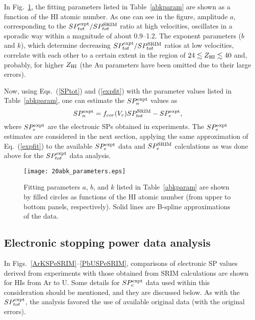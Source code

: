 \documentclass[aps,pra,twocolumn,amsmath,amssymb,floatfix]{revtex4-2}
\begin{document}
In Fig.~\ref{abkpar}, the fitting parameters listed in Table~\ref{abkparam} are shown as a function of the HI atomic number. As one can see in the figure, amplitude $a$, corresponding to the $SP_{tot}^{\rm expt}/SP_{tot}^{\rm SRIM}$ ratio at high velocities, oscillates in a sporadic way within a magnitude of about 0.9--1.2. The exponent parameters ($b$ and $k$), which determine decreasing $SP_{tot}^{\rm expt} / SP_{tot}^{\rm SRIM}$ ratios at low velocities, correlate with each other to a certain extent in the region of $24 \lesssim Z_{\rm HI} \lesssim 40$ and, probably, for higher $Z_{\rm HI}$ (the Au parameters have been omitted due to their large errors).

Now, using Eqs.~(\ref{SPtot}) and (\ref{expfit}) with the parameter values listed in Table~\ref{abkparam}, one can estimate the $SP_{n}^{\rm expt}$ values as
\begin{equation}
  SP_{n}^{\rm expt} = f_{cor}(V_{r}) SP_{tot}^{\rm SRIM} - SP_{e}^{\rm expt},                                          \label{SPnexpt}
\end{equation}
where $SP_{e}^{\rm expt}$ are the electronic SPs obtained in experiments. The $SP_{e}^{\rm expt}$ estimates are considered in the next section, applying the same approximation of Eq.~(\ref{expfit}) to the available $SP_{e}^{\rm expt}$ data and $SP_{e}^{\rm SRIM}$ calculations as was done above for the $SP_{tot}^{\rm expt}$ data analysis.

\begin{figure}[!h]  %
\begin{center}
\texttt{[image: 20abk\_parameters.eps]}
\vspace*{-1.5mm}
\caption{\label{abkpar}Fitting parameters $a$, $b$, and $k$ listed in Table~\ref{abkparam} are shown by filled circles as functions of the HI atomic number (from upper to bottom panels, respectively). Solid lines are B-spline approximations of the data.}
\end{center}
\end{figure}


\subsection{\label{SPeSRIM}Electronic stopping power data analysis}

In Figs.~\ref{ArKSPeSRIM}--\ref{PbUSPeSRIM}, comparisons of electronic SP values derived from experiments with those obtained from SRIM calculations are shown for HIs from Ar to U. Some details for $SP_{e}^{\rm expt}$ data used within this consideration should be mentioned, and they are discussed below. As with the $SP_{tot}^{\rm expt}$, the analysis favored the use of available original data (with the original errors).
\end{document}
